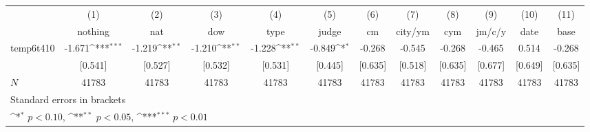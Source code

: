 {
\def\sym#1{\ifmmode^{#1}\else\(^{#1}\)\fi}
\begin{tabular}{l*{11}{c}}
\hline\hline
            &\multicolumn{1}{c}{(1)}&\multicolumn{1}{c}{(2)}&\multicolumn{1}{c}{(3)}&\multicolumn{1}{c}{(4)}&\multicolumn{1}{c}{(5)}&\multicolumn{1}{c}{(6)}&\multicolumn{1}{c}{(7)}&\multicolumn{1}{c}{(8)}&\multicolumn{1}{c}{(9)}&\multicolumn{1}{c}{(10)}&\multicolumn{1}{c}{(11)}\\
            &\multicolumn{1}{c}{nothing}&\multicolumn{1}{c}{nat}&\multicolumn{1}{c}{dow}&\multicolumn{1}{c}{type}&\multicolumn{1}{c}{judge}&\multicolumn{1}{c}{cm}&\multicolumn{1}{c}{city/ym}&\multicolumn{1}{c}{cym}&\multicolumn{1}{c}{jm/c/y}&\multicolumn{1}{c}{date}&\multicolumn{1}{c}{base}\\
\hline
temp6t410   &      -1.671\sym{***}&      -1.219\sym{**} &      -1.210\sym{**} &      -1.228\sym{**} &      -0.849\sym{*}  &      -0.268         &      -0.545         &      -0.268         &      -0.465         &       0.514         &      -0.268         \\
            &     [0.541]         &     [0.527]         &     [0.532]         &     [0.531]         &     [0.445]         &     [0.635]         &     [0.518]         &     [0.635]         &     [0.677]         &     [0.649]         &     [0.635]         \\
\hline
\(N\)       &       41783         &       41783         &       41783         &       41783         &       41783         &       41783         &       41783         &       41783         &       41783         &       41783         &       41783         \\
\hline\hline
\multicolumn{12}{l}{\footnotesize Standard errors in brackets}\\
\multicolumn{12}{l}{\footnotesize \sym{*} \(p<0.10\), \sym{**} \(p<0.05\), \sym{***} \(p<0.01\)}\\
\end{tabular}
}
